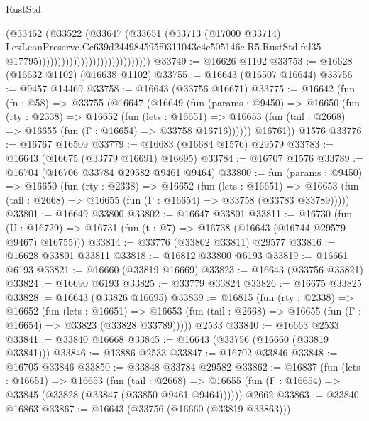 \begin{lexlean}{RustStd}
\begin{coremodule}
                                                    (@33462
                                                      (@33522
                                                        (@33647
                                                          (@33651
                                                            (@33713
                                                              (@17000 @33714)
                                                              LexLeanPreserve.Cc639d244984595f0311043c4c505146e.R5.RustStd.fal35
                                                              @17795)))))))))))))))))))))))))))))
@33749 := @16626 @1102
@33753 := @16628 (@16632 @1102) (@16638 @1102)
@33755 := @16643 (@16507 @16644)
@33756 := @9457 @14469
@33758 := @16643 (@33756 @16671)
@33775 := @16642
    (fun (fn : @58) =>
    @33755
      (@16647
        (@16649
          (fun (params : @9450) =>
          @16650
            (fun (rty : @2338) =>
            @16652
              (fun (lets : @16651) =>
              @16653 (fun (tail : @2668) => @16655 (fun (Γ : @16654) => @33758 @16716))))))
        @16761))
    @1576
@33776 := @16767 @16509
@33779 := @16683 (@16684 @1576) @29579
@33783 := @16643 (@16675 (@33779 @16691) @16695)
@33784 := @16707 @1576
@33789 := @16704 (@16706 @33784 @29582 @9461 @9464)
@33800 := fun (params : @9450) =>
  @16650
    (fun (rty : @2338) =>
    @16652
      (fun (lets : @16651) =>
      @16653 (fun (tail : @2668) => @16655 (fun (Γ : @16654) => @33758 (@33783 @33789)))))
@33801 := @16649 @33800
@33802 := @16647 @33801
@33811 := @16730
    (fun (U : @16729) => @16731 (fun (t : @7) => @16738 (@16643 (@16744 @29579 @9467) @16755)))
@33814 := @33776 (@33802 @33811) @29577
@33816 := @16628 @33801 @33811
@33818 := @16812 @33800 @6193
@33819 := @16661 @6193
@33821 := @16660 (@33819 @16669)
@33823 := @16643 (@33756 @33821)
@33824 := @16690 @6193
@33825 := @33779 @33824
@33826 := @16675 @33825
@33828 := @16643 (@33826 @16695)
@33839 := @16815
    (fun (rty : @2338) =>
    @16652
      (fun (lets : @16651) =>
      @16653 (fun (tail : @2668) => @16655 (fun (Γ : @16654) => @33823 (@33828 @33789)))))
    @2533
@33840 := @16663 @2533
@33841 := @33840 @16668
@33845 := @16643 (@33756 (@16660 (@33819 @33841)))
@33846 := @13886 @2533
@33847 := @16702 @33846
@33848 := @16705 @33846
@33850 := @33848 @33784 @29582
@33862 := @16837
    (fun (lets : @16651) =>
    @16653
      (fun (tail : @2668) =>
      @16655 (fun (Γ : @16654) => @33845 (@33828 (@33847 (@33850 @9461 @9464))))))
    @2662
@33863 := @33840 @16863
@33867 := @16643 (@33756 (@16660 (@33819 @33863)))

\end{coremodule}
\end{lexlean}
